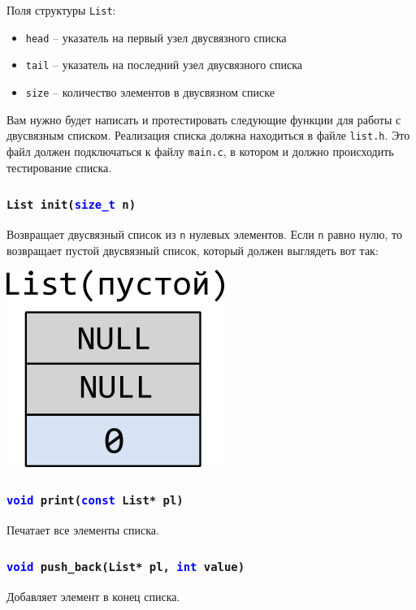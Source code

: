 \documentclass{article}
\begin{document}
Поля структуры \texttt{List}:
\begin{itemize}
\item \texttt{head} -- указатель на первый узел двусвязного списка
\item \texttt{tail} -- указатель на последний узел двусвязного списка
\item \texttt{size} -- количество элементов в двусвязном списке
\end{itemize}
Вам нужно будет написать и протестировать следующие функции для работы с двусвязным списком.
Реализация списка должна находиться в файле \texttt{list.h}. Это файл должен подключаться к файлу \texttt{main.c}, в котором и должно происходить тестирование списка.

\subsubsection{\texttt{List init(\textcolor{blue}{size\_t} n)}}
Возвращает двусвязный список из \texttt{n} нулевых элементов. Если \texttt{n} равно нулю, то возвращает пустой двусвязный список, который должен выглядеть вот так:
\begin{center}
\includegraphics[scale=1]{../images/list_empty.png}
\end{center}

\subsubsection{\texttt{\textcolor{blue}{void} print(\textcolor{blue}{const} List* pl)}}
Печатает все элементы списка.

\subsubsection{\texttt{\textcolor{blue}{void} push\_back(List* pl, \textcolor{blue}{int} value)}}
Добавляет элемент в конец списка.
\end{document}
